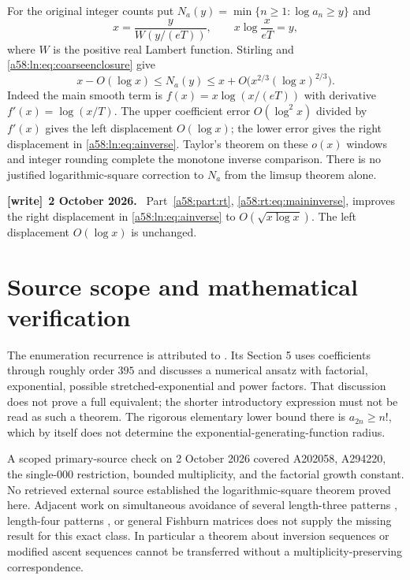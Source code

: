 \documentclass[11pt,letterpaper]{article}
\theoremstyle{remark}
\newenvironment{writenote}[1][]{\par\smallskip\begingroup\small
 \noindent\textbf{[write]}\if\relax\detokenize{#1}\relax\else~\textbf{#1.}\fi\ }%
 {\par\endgroup\smallskip}
\begin{document}
For the original integer counts put
$N_a(y)=\min\{n\ge1:\log a_n\ge y\}$ and
\begin{equation}\label{a58:ln:eq:lambert}
 x=\frac{y}{W(y/(eT))},\qquad x\log\frac{x}{eT}=y,
\end{equation}
where $W$ is the positive real Lambert function. Stirling and
\eqref{a58:ln:eq:coarseenclosure} give
\begin{equation}\label{a58:ln:eq:ainverse}
 x-O(\log x)\le N_a(y)
 \le x+O\bigl(x^{2/3}(\log x)^{2/3}\bigr).
\end{equation}
Indeed the main smooth term is $f(x)=x\log(x/(eT))$ with derivative
$f'(x)=\log(x/T)$. The upper coefficient error $O(\log^2x)$ divided by
$f'(x)$ gives the left displacement $O(\log x)$; the lower error gives
the right displacement in \eqref{a58:ln:eq:ainverse}. Taylor's theorem on these
$o(x)$ windows and integer rounding complete the monotone inverse
comparison. There is no justified logarithmic-square correction to
$N_a$ from the limsup theorem alone.
\begin{writenote}[2 October 2026]
Part~\ref{a58:part:rt}, \eqref{a58:rt:eq:maininverse}, improves the right displacement in \eqref{a58:ln:eq:ainverse} to $O(\sqrt{x\log x})$. The left displacement $O(\log x)$ is unchanged.
\end{writenote}

\section{Source scope and mathematical verification}\label{a58:ln:sec:sources}
The enumeration recurrence is attributed to \cite{CCEG}. Its Section 5
uses coefficients through roughly order $395$ and discusses a numerical
ansatz with factorial, exponential, possible stretched-exponential and
power factors. That discussion does not prove a full equivalent; the
shorter introductory expression must not be read as such a theorem.
The rigorous elementary lower bound there is $a_{2n}\ge n!$, which by
itself does not determine the exponential-generating-function radius.

A scoped primary-source check on 2 October 2026 covered A202058,
A294220, the single-$000$ restriction, bounded multiplicity, and the
factorial growth constant. No retrieved external source established the
logarithmic-square theorem proved here. Adjacent work on simultaneous
avoidance of several length-three patterns \cite{CallanMansour}, length-four
patterns \cite{LiuKitaevZhang}, or general Fishburn matrices \cite{HwangJin} does not
supply the missing result for this exact class. In particular a theorem
about inversion sequences or modified ascent sequences cannot be
transferred without a multiplicity-preserving correspondence.
\end{document}
